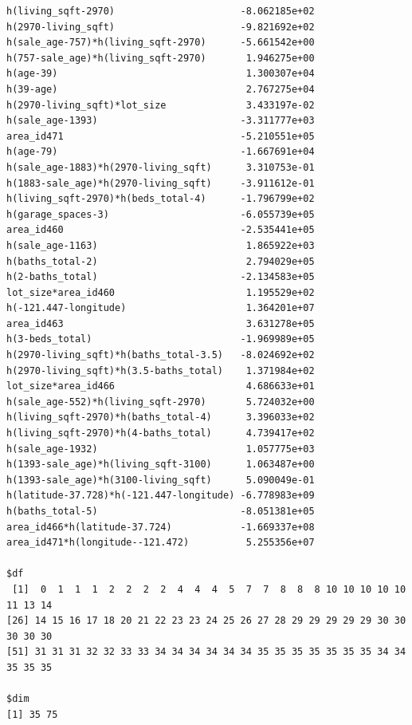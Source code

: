 \documentclass[
]{article}
\begin{document}
\begin{verbatim}
h(living_sqft-2970)                      -8.062185e+02
h(2970-living_sqft)                      -9.821692e+02
h(sale_age-757)*h(living_sqft-2970)      -5.661542e+00
h(757-sale_age)*h(living_sqft-2970)       1.946275e+00
h(age-39)                                 1.300307e+04
h(39-age)                                 2.767275e+04
h(2970-living_sqft)*lot_size              3.433197e-02
h(sale_age-1393)                         -3.311777e+03
area_id471                               -5.210551e+05
h(age-79)                                -1.667691e+04
h(sale_age-1883)*h(2970-living_sqft)      3.310753e-01
h(1883-sale_age)*h(2970-living_sqft)     -3.911612e-01
h(living_sqft-2970)*h(beds_total-4)      -1.796799e+02
h(garage_spaces-3)                       -6.055739e+05
area_id460                               -2.535441e+05
h(sale_age-1163)                          1.865922e+03
h(baths_total-2)                          2.794029e+05
h(2-baths_total)                         -2.134583e+05
lot_size*area_id460                       1.195529e+02
h(-121.447-longitude)                     1.364201e+07
area_id463                                3.631278e+05
h(3-beds_total)                          -1.969989e+05
h(2970-living_sqft)*h(baths_total-3.5)   -8.024692e+02
h(2970-living_sqft)*h(3.5-baths_total)    1.371984e+02
lot_size*area_id466                       4.686633e+01
h(sale_age-552)*h(living_sqft-2970)       5.724032e+00
h(living_sqft-2970)*h(baths_total-4)      3.396033e+02
h(living_sqft-2970)*h(4-baths_total)      4.739417e+02
h(sale_age-1932)                          1.057775e+03
h(1393-sale_age)*h(living_sqft-3100)      1.063487e+00
h(1393-sale_age)*h(3100-living_sqft)      5.090049e-01
h(latitude-37.728)*h(-121.447-longitude) -6.778983e+09
h(baths_total-5)                         -8.051381e+05
area_id466*h(latitude-37.724)            -1.669337e+08
area_id471*h(longitude--121.472)          5.255356e+07

$df
 [1]  0  1  1  1  2  2  2  2  4  4  4  5  7  7  8  8  8 10 10 10 10 10 11 13 14
[26] 14 15 16 17 18 20 21 22 23 23 24 25 26 27 28 29 29 29 29 29 30 30 30 30 30
[51] 31 31 31 32 32 33 33 34 34 34 34 34 34 35 35 35 35 35 35 35 34 34 35 35 35

$dim
[1] 35 75


\end{verbatim}
\end{document}
